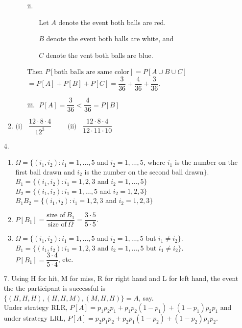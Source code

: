 \begin{enumerate}
\begin{enumerate}
\begin{enumerate}
			\item[ii.$\;\;\;$] \begin{enumerate}
				\item[Let] $A$ denote the event both balls are red. 
				\item[] $B$ denote the event both balls are white, and 
				\item[] $C$ denote the vent both balls are blue. 
			\end{enumerate}
				Then $P[\text{both balls are same color}] = P[A\cup B\cup C]$ $= P[A]+P[B]+P[C] =  \dfrac{3}{36} + \dfrac{4}{36} + \dfrac{3}{36}$.
			
			\item[iii.$\;$] $ P[A] = \dfrac{3}{36} < \dfrac{4}{36} = P[B]$
		\end{enumerate} 
		
		\item $\text{(i)}\;\;\; \dfrac{12\cdot 8\cdot 4}{12^3}\quad\quad$ $\text{(ii)}\;\;\; \dfrac{12\cdot 8\cdot 4}{12\cdot 11\cdot 10}$
		
	\end{enumerate}
	
	\newpage
	\item[4.] \begin{enumerate}
	
		\item $\Omega = \{(i_1,i_2)\colon i_1=1,\ldots,5$ and $i_2=1,\ldots, 5$, where 
	$i_1$ is the number on the first ball drawn and 
	$i_2$ is the number on the second ball drawn$\}$. \\
	$B_1 = \{(i_1,i_2)\colon i_1=1,2,3$ and $i_2=1,\ldots, 5 \}$\\
	$B_2 = \{(i_1,i_2)\colon i_1=1,\ldots,5$ and $i_2=1, 2, 3 \}$\\
	$B_1B_2 = \{(i_1,i_2)\colon i_1=1,2,3$ and $i_2=1, 2, 3 \}$
	
		\item $P[B_1] = \dfrac{\text{size of}\ B_1}{\text{size of}\ \Omega} = \dfrac{3\cdot 5}{5\cdot 5}$.
		
		\item  $\Omega = \{(i_1,i_2)\colon i_1=1,\ldots,5$ and $i_2=1,\ldots, 5$ but $i_1\ne i_2\}$. \\
		$B_1 = \{(i_1,i_2)\colon i_1=1,2,3$ and $i_2=1,\ldots, 5$ but $i_1\ne i_2 \}$. \\
		$P[B_1] = \dfrac{3\cdot 4}{5\cdot 4}$, etc.
		\end{enumerate} 
	
	\item[7.] Using H for hit, M for miss, R for right hand and L for left hand, the event the the participant is successful is \\
	$\{(H,H,H), (H,H,M), (M,H,H)\} = A$, say. \\
	Under strategy RLR, $P[A] = p_1p_2p_1 + p_1p_2(1-p_1) + (1-p_1)p_2p_1$ and \\
	under strategy LRL, $P[A] = p_2p_1p_2 + p_2p_1(1-p_2) + (1-p_2)p_1p_2$. 
	 

\end{enumerate}
